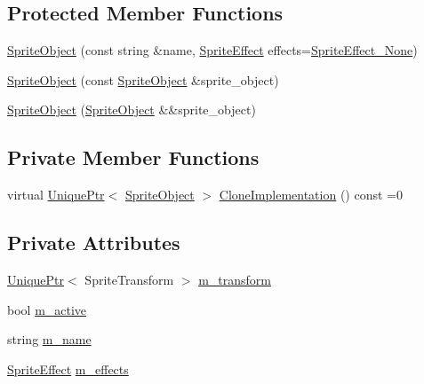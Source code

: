 \subsection*{Protected Member Functions}
\begin{DoxyCompactItemize}
\item 
\hyperlink{classmage_1_1_sprite_object_a1d487cfddfd6e3f60047f9316522ba8b}{Sprite\+Object} (const string \&name, \hyperlink{namespacemage_a9cfe18123066ba4236f548f9de75d881}{Sprite\+Effect} effects=\hyperlink{namespacemage_a9cfe18123066ba4236f548f9de75d881af3c275fbfacfe174da928b2f24dfa515}{Sprite\+Effect\+\_\+\+None})
\item 
\hyperlink{classmage_1_1_sprite_object_ac75871029cd740aeb0dd3e23d037b703}{Sprite\+Object} (const \hyperlink{classmage_1_1_sprite_object}{Sprite\+Object} \&sprite\+\_\+object)
\item 
\hyperlink{classmage_1_1_sprite_object_a32243a50679f743554850069f27cca9b}{Sprite\+Object} (\hyperlink{classmage_1_1_sprite_object}{Sprite\+Object} \&\&sprite\+\_\+object)
\end{DoxyCompactItemize}
\subsection*{Private Member Functions}
\begin{DoxyCompactItemize}
\item 
virtual \hyperlink{namespacemage_a8c307fbcc33bce9b7f2aa4c26c3b95cf}{Unique\+Ptr}$<$ \hyperlink{classmage_1_1_sprite_object}{Sprite\+Object} $>$ \hyperlink{classmage_1_1_sprite_object_acbbe3d5894e5a43df411b7e5785ae174}{Clone\+Implementation} () const =0
\end{DoxyCompactItemize}
\subsection*{Private Attributes}
\begin{DoxyCompactItemize}
\item 
\hyperlink{namespacemage_a8c307fbcc33bce9b7f2aa4c26c3b95cf}{Unique\+Ptr}$<$ Sprite\+Transform $>$ \hyperlink{classmage_1_1_sprite_object_a9523ae6f081a8fde3cbb3558f6e327da}{m\+\_\+transform}
\item 
bool \hyperlink{classmage_1_1_sprite_object_a6694bb9cade83917202cf9ca6d359e81}{m\+\_\+active}
\item 
string \hyperlink{classmage_1_1_sprite_object_a6f2a859e40ed391909bb4c87a8b74480}{m\+\_\+name}
\item 
\hyperlink{namespacemage_a9cfe18123066ba4236f548f9de75d881}{Sprite\+Effect} \hyperlink{classmage_1_1_sprite_object_a270f73b8d316f72c4228854d08a6d2ea}{m\+\_\+effects}
\end{DoxyCompactItemize}


